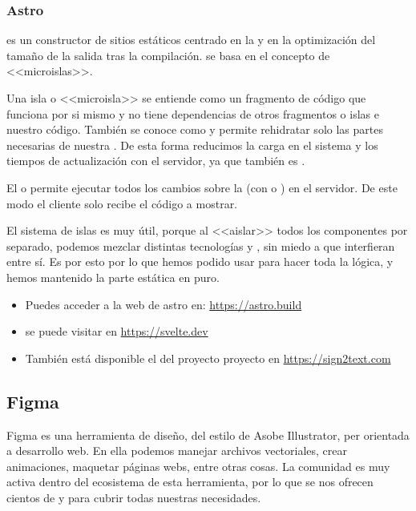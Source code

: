 \subsubsection{Astro}

 es un constructor de sitios estáticos centrado en la  y en la optimización del tamaño de la salida tras la compilación.  se basa en el concepto de <<microislas>>.

Una isla o <<microisla>> se entiende como un fragmento de código que funciona por si mismo y no tiene dependencias de otros fragmentos o islas e nuestro código. También se conoce como  y permite rehidratar solo las partes necesarias de nuestra . De esta forma reducimos la carga en el sistema y los tiempos de actualización con el servidor, ya que también es .

El  o  permite ejecutar todos los cambios sobre la  (con  o ) en el servidor. De este modo el cliente solo recibe el código  a mostrar.

El sistema de islas es muy útil, porque al <<aislar>> todos los componentes por separado, podemos mezclar distintas tecnologías y , sin miedo a que interfieran entre sí. Es por esto por lo que hemos podido usar  para hacer toda la lógica, y hemos mantenido la parte estática en  puro.

\begin{itemize}
  \item Puedes acceder a la web de astro en: \url{https://astro.build}
  \item {} se puede visitar en \url{https://svelte.dev}
  \item También está disponible el  del proyecto proyecto en \url{https://sign2text.com}
\end{itemize}

\subsection{Figma}

Figma es una herramienta de diseño, del estilo de Asobe Illustrator, per orientada a desarrollo web. En ella podemos manejar archivos vectoriales, crear animaciones, maquetar páginas webs, entre otras cosas. La comunidad es muy activa dentro del ecosistema de esta herramienta, por lo que se nos ofrecen cientos de  y  para cubrir todas nuestras necesidades.

